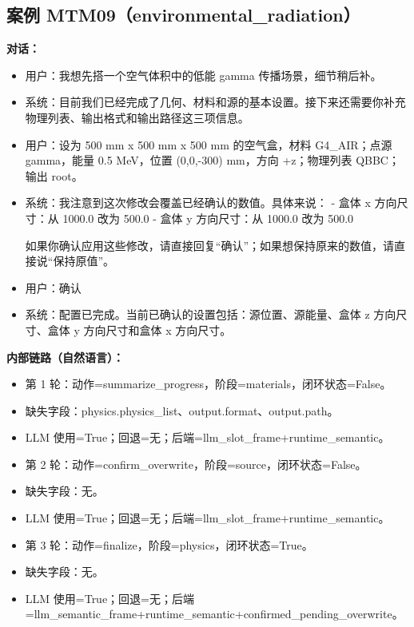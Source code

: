 \documentclass[11pt]{ctexart}
\begin{document}
\subsection{案例 MTM09（environmental\_radiation）}
\textbf{对话：}
\begin{itemize}
\item 用户：我想先搭一个空气体积中的低能 gamma 传播场景，细节稍后补。
\item 系统：目前我们已经完成了几何、材料和源的基本设置。接下来还需要你补充物理列表、输出格式和输出路径这三项信息。
\item 用户：设为 500 mm x 500 mm x 500 mm 的空气盒，材料 G4\_AIR；点源 gamma，能量 0.5 MeV，位置 (0,0,-300) mm，方向 +z；物理列表 QBBC；输出 root。
\item 系统：我注意到这次修改会覆盖已经确认的数值。具体来说：  
- 盒体 x 方向尺寸：从 1000.0 改为 500.0  
- 盒体 y 方向尺寸：从 1000.0 改为 500.0  

如果你确认应用这些修改，请直接回复“确认”；如果想保持原来的数值，请直接说“保持原值”。
\item 用户：确认
\item 系统：配置已完成。当前已确认的设置包括：源位置、源能量、盒体 z 方向尺寸、盒体 y 方向尺寸和盒体 x 方向尺寸。
\end{itemize}
\textbf{内部链路（自然语言）：}
\begin{itemize}
\item 第 1 轮：动作=summarize\_progress，阶段=materials，闭环状态=False。
\item 缺失字段：physics.physics\_list、output.format、output.path。
\item LLM 使用=True；回退=无；后端=llm\_slot\_frame+runtime\_semantic。
\item 第 2 轮：动作=confirm\_overwrite，阶段=source，闭环状态=False。
\item 缺失字段：无。
\item LLM 使用=True；回退=无；后端=llm\_slot\_frame+runtime\_semantic。
\item 第 3 轮：动作=finalize，阶段=physics，闭环状态=True。
\item 缺失字段：无。
\item LLM 使用=True；回退=无；后端=llm\_semantic\_frame+runtime\_semantic+confirmed\_pending\_overwrite。
\end{itemize}
\end{document}
